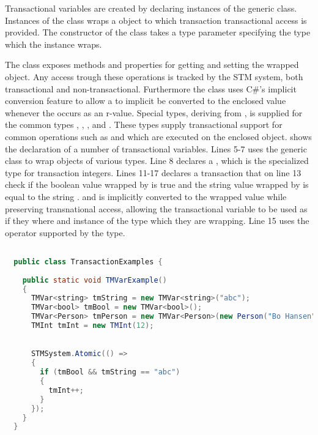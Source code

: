 Transactional variables are created by declaring instances of the generic  class. Instances of the  class wraps a object to which transaction transactional access is provided.  The constructor of the  class takes a type parameter specifying the type which the  instance wraps.

The  class exposes methods and properties for getting and setting the wrapped object. Any access trough these operations is tracked by the \ac{STM} system, both transactional and non-transactional. Furthermore the  class uses C\#'s implicit conversion feature to allow a  to implicit be converted to the enclosed value whenever the  occurs as an r-value. Special types, deriving from , is supplied for the common types , , ,   and . These types supply transactional support for common operations such as \bscode{++} and \bscode{--} which are executed on the enclosed object.   shows the declaration of a number of transactional variables. Lines 5-7 uses the generic  class to wrap objects of various types. Line 8 declares a , which is the specialized type for transaction integers. Lines 11-17 declares a transaction that on line 13 check if the boolean value wrapped by  is true and the string value wrapped by  is equal to the string .  and  is implicitly converted to the wrapped value while preserving transnational access, allowing the transactional variable to be used as if they where and instance of the type which they are wrapping. Line 15 uses the \bscode{++} operator supported by the  type.
\begin{lstlisting}[label=lst:library_tmvar,
  caption={Library Transactional Variable},
  language=Java,  
  showspaces=false,
  showtabs=false,
  breaklines=true,
  showstringspaces=false,
  breakatwhitespace=true,
  commentstyle=\color{greencomments},
  keywordstyle=\color{bluekeywords},
  stringstyle=\color{redstrings},
  morekeywords={atomic, retry, orElse, var, get, set, string, bool}]  % Start your code-block

  public class TransactionExamples {
      
    public static void TMVarExample()
    {
      TMVar<string> tmString = new TMVar<string>("abc");
      TMVar<bool> tmBool = new TMVar<bool>();
      TMVar<Person> tmPerson = new TMVar<Person>(new Person("Bo Hansen", 57));
      TMInt tmInt = new TMInt(12);
           

      STMSystem.Atomic(() =>
      {
        if (tmBool && tmString == "abc")
        {
          tmInt++;
        }
      });
    }
  }
\end{lstlisting}

